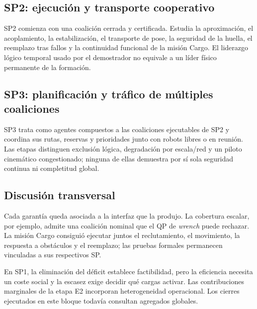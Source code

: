 \clearpage
\subsection{SP2: ejecución y transporte cooperativo}
\label{subsec:sp2}

SP2 comienza con una coalición cerrada y certificada. Estudia la aproximación, el acoplamiento, la estabilización, el transporte de pose, la seguridad de la huella, el reemplazo tras fallos y la continuidad funcional de la misión Cargo. El liderazgo lógico temporal usado por el demostrador no equivale a un líder físico permanente de la formación.






\clearpage
\subsection{SP3: planificación y tráfico de múltiples coaliciones}
\label{subsec:sp3}

SP3 trata como agentes compuestos a las coaliciones ejecutables de SP2 y coordina sus rutas, reservas y prioridades junto con robots libres o en reunión. Las etapas distinguen exclusión lógica, degradación por escala/red y un piloto cinemático congestionado; ninguna de ellas demuestra por sí sola seguridad continua ni completitud global.





\clearpage

\subsection{Discusión transversal}
\label{subsec:cross-discussion}

Cada garantía queda asociada a la interfaz que la produjo. La cobertura escalar, por ejemplo, admite una coalición nominal que el QP de \emph{wrench} puede rechazar. La misión Cargo consiguió ejecutar juntos el reclutamiento, el movimiento, la respuesta a obstáculos y el reemplazo; las pruebas formales permanecen vinculadas a sus respectivos SP.

En SP1, la eliminación del déficit establece factibilidad, pero la eficiencia necesita un coste social y la escasez exige decidir qué cargas activar. Las contribuciones marginales de la etapa E2 incorporan heterogeneidad operacional. Los cierres ejecutados en este bloque todavía consultan agregados globales.

